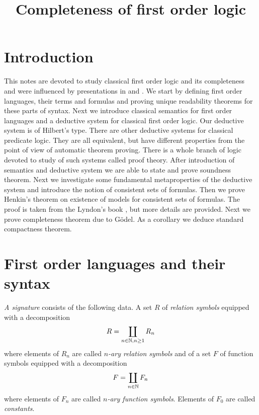



\title{Completeness of first order logic}
\date{}
\maketitle

\section{Introduction}
\noindent
This notes are devoted to study classical first order logic and its completeness and were influenced by presentations in \cite{enderton2001mathematical} and \cite{lyndon1966notes}. We start by defining first order languages, their terms and formulas and proving unique readability theorems for these parts of syntax. Next we introduce classical semantics for first order languages and a deductive system for classical first order logic. Our deductive system is of Hilbert’s type. There are other deductive systems for classical predicate logic. They are all equivalent, but have different properties from the point of view of automatic theorem proving. There is a whole branch of logic devoted to study of such systems called proof theory. After introduction of semantics and deductive system we are able to state and prove soundness theorem. Next we investigate some fundamental metaproperties of the deductive system and introduce the notion of consistent sets of formulas. Then we prove Henkin’s theorem on existence of models for consistent sets of formulas. The proof is taken from the Lyndon’s book \cite{lyndon1966notes}, but more details are provided. Next we prove completeness theorem due to Gödel. As a corollary we deduce standard compactness theorem.

\section{First order languages and their syntax}

\begin{definition}
\textit{A signature} consists of the following data. A set $R$ of \textit{relation symbols} equipped with a decomposition
$$R = \coprod_{n\in {\mathbb N},n\geq 1}R_n$$
where elements of $R_n$ are called \textit{$n$-ary relation symbols} and of a set $F$ of function symbols equipped with a decomposition
$$F = \coprod_{n\in {\mathbb N}}F_n$$
where elements of $F_n$ are called \textit{$n$-ary function symbols}. Elements of $F_0$ are called \textit{constants}.
\end{definition}

